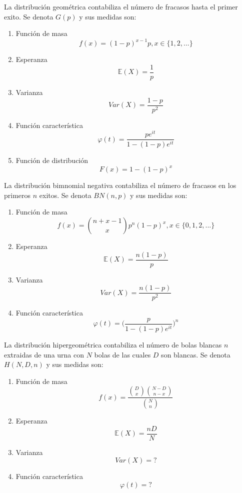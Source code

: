 \begin{defn}[Geométrica]
La distribución geométrica contabiliza el número de fracasos hasta el primer exito. Se denota $G(p)$ y sus medidas son:

\begin{enumerate}[label=(\roman*)]
    \item Función de masa \[ f(x) = (1-p)^{x-1}p, x\in\{1,2,...\} \]
    \item Esperanza \[ \mathbb{E}(X) = \frac{1}{p}\]
    \item Varianza \[ Var(X) = \frac{1-p}{p^2} \]
    \item Función característica \[ \varphi(t) = \frac{pe^{it}}{1 - (1-p)e^{it}} \]
    \item Función de distribución \[ F(x) = 1-(1-p)^x \]
\end{enumerate}
\end{defn}

\begin{ejr}[2.16 , Schaum]

\end{ejr}

\begin{ejr}[2.29 , Schaum]

\end{ejr}

\begin{defn}
La distribución bimnomial negativa contabiliza el número de fracasos en los primeros $n$ exitos. Se denota $BN(n,p)$ y sus medidas son:
\begin{enumerate}[label=(\roman*)]
    \item Función de masa \[ f(x) = \binom{n + x - 1}{x} p^n(1-p)^x, x\in\{0,1,2,...\} \]
    \item Esperanza \[ \mathbb{E}(X) = \frac{n(1-p)}{p} \]
    \item Varianza \[ Var(X) = \frac{n(1-p)}{p^2} \]
    \item Función característica \[ \varphi(t) = \big(\frac{p}{1 - (1-p)e^{it}}\big)^n \]
\end{enumerate}
\end{defn}

\begin{ejr}[2.18 , Schaum]

\end{ejr}

\begin{defn}[Hipergeométrica]
La distribución hipergeométrica contabiliza el número de bolas blancas $n$ extraidas de una urna con $N$ bolas de las cuales $D$ son blancas. Se denota $H(N,D,n)$ y sus medidas son:
\begin{enumerate}[label=(\roman*)]
    \item Función de masa \[ f(x) = \frac{\binom{D}{x}\binom{N-D}{n-x}}{\binom{N}{n}} \]
    \item Esperanza \[ \mathbb{E}(X) = \frac{nD}{N} \]
    \item Varianza \[ Var(X) = ? \]
    \item Función característica \[ \varphi(t) = ? \]
\end{enumerate}

\end{defn}

